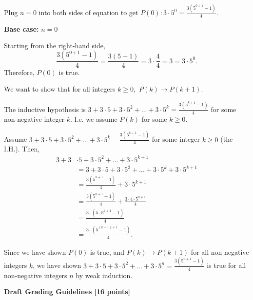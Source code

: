\documentclass[12pt]{exam}
\begin{document}
\begin{solution}
\begin{parts}
    \item Plug $n = 0$ into both sides of equation to get $P(0): 3 \cdot 5^0 = \frac{3 (5^{0+1} - 1)}{4}$.
    
    \textbf{Base case:} $n = 0$
    
    Starting from the right-hand side,
    $$\frac{3 (5^{0+1} - 1)}{4} = \frac{3 (5 - 1)}{4} = 3 \cdot \frac{4}{4} = 3 = 3 \cdot 5^0.$$
    Therefore, $P(0)$ is true.
    \item We want to show that for all integers $k \geq 0,$ $P(k) \rightarrow P(k+1)$.
    \item The inductive hypothesis is $3 + 3 \cdot 5 + 3 \cdot 5^2 + \dots + 3 \cdot 5^k = \frac{3 (5^{k+1} - 1)}{4}$ for some non-negative integer $k$. I.e. we assume $P(k)$ for some $k\ge 0.$
    \item Assume $3 + 3 \cdot 5 + 3 \cdot 5^2 + ... + 3 \cdot 5^k = \frac{3 (5^{k+1} - 1)}{4}$ for some integer $k \geq 0$ (the I.H.). Then,
    \begin{align*}
        3 + 3 &\cdot 5 + 3 \cdot 5^2 + ... + 3 \cdot 5^{k+1} \\
        &= 3 + 3 \cdot 5 + 3 \cdot 5^2 + ... + 3 \cdot 5^k + 3 \cdot 5^{k+1}\\
        &= \frac{3 (5^{k+1} - 1)}{4} + 3 \cdot 5^{k+1} \tag{by IH}\\
        &= \frac{3 (5^{k+1} - 1)}{4} + \frac{3 \cdot 4 \cdot 5^{k+1}}{4}\\
        &= \frac{3 \cdot (5 \cdot 5^{k+1} - 1)}{4}\\
        &= \frac{3 \cdot (5^{(k+1)+1} - 1)}{4}.
    \end{align*}
    \item Since we have shown $P(0)$ is true, and $P(k) \rightarrow P(k+1)$ for all non-negative integers $k$, we have shown $3 + 3 \cdot 5 + 3 \cdot 5^2 + ... + 3 \cdot 5^n = \frac{3 (5^{n+1} - 1)}{4}$ is true for all non-negative integers $n$ by weak induction.
    
\end{parts}


\smallskip

\textbf{Draft Grading Guidelines [16 points]}


\end{solution}
\end{document}
